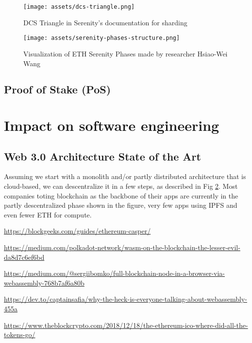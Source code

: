 \documentclass[runningheads]{llncs}
\begin{document}
\begin{figure}
    \centering
    \texttt{[image: assets/dcs-triangle.png]}
    \caption[Ethereum Serenity DCS Triangle]{DCS Triangle in Serenity's documentation \cite{DCSserenity} for sharding}
    \label{fig:Serenity-2}
\end{figure}


\begin{figure}
    \centering
    \texttt{[image: assets/serenity-phases-structure.png]}
    \caption[Ethereum Serenity Phases]{Visualization of ETH Serenity Phases made by researcher Hsiao-Wei Wang}
    \label{fig:Serenity-3}
\end{figure}



\subsection{Proof of Stake (PoS)}




\FloatBarrier
\section{Impact on software engineering}

\subsection{Web 3.0 Architecture State of the Art}

Assuming we start with a monolith and/or partly distributed architecture that is cloud-based, we can descentralize it in a few steps, as described in Fig \ref{fig:Serenity-3}. Most companies toting blockchain as the backbone of their apps are currently in the partly descentralized phase shown in the figure, very few apps using IPFS and even fewer ETH for compute.


\url{https://blockgeeks.com/guides/ethereum-casper/}

\url{https://medium.com/polkadot-network/wasm-on-the-blockchain-the-lesser-evil-da8d7c6ef6bd}

\url{https://medium.com/@sergiibomko/full-blockchain-node-in-a-browser-via-webassembly-768b7af6a80b}

\url{https://dev.to/captainsafia/why-the-heck-is-everyone-talking-about-webassembly-455a}

\url{https://www.theblockcrypto.com/2018/12/18/the-ethereum-ico-where-did-all-the-tokens-go/}
\end{document}
